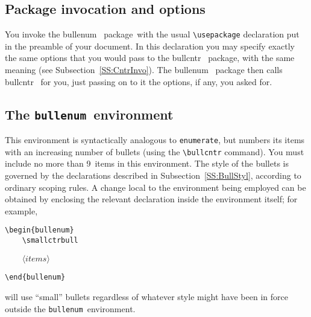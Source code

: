 \documentclass[a4paper]{article}
\DeclareRobustCommand*{\packlass}[1]{%
	{\texorpdfstring{\normalfont \sffamily}{}#1}%
}
\DeclareRobustCommand*{\meta}[1]{\mbox{\(\langle\textit{#1}\rangle\)}}
\DeclareRobustCommand*{\env}[1]{\texttt{#1}}
\newcommand*{\Bullcntr}{bullcntr}
\newcommand*{\bull}{\packlass{\Bullcntr}}
\newcommand*{\tbull}{the \bull\ package}
\newcommand*{\Bullenum}{bullenum}
\newcommand*{\benu}{\packlass{\Bullenum}}
\newcommand*{\tbenu}{the \benu\ package}
\newcommand*{\Enumerat}{enumerate}
\newcommand*{\beenv}{\env{\Bullenum}}
\newcommand*{\enenv}{\env{\Enumerat}}
\begin{document}
\subsection{Package invocation and options}
\label{SS:EnumInvo}

You invoke \tbenu\ with the usual \verb|\usepackage| declaration put
in the preamble of your document.  In this declaration you may specify
exactly the same options that you would pass to \tbull, with the same
meaning (see Subsection~\ref{SS:CntrInvo}).  The \benu\ package then
calls \bull\ for you, just passing on to it the options, if any, you
asked for.




\subsection{The \beenv\ environment}
\label{SS:EnumEnvi}

This environment is syntactically analogous to \enenv, but numbers its
items with an increasing number of bullets (using the \verb|\bullcntr|
command).  You must include no more than 9~items in this environment.
The style of the bullets is governed by the declarations described in
Subsection~\ref{SS:BullStyl}, according to ordinary scoping rules.  A
change local to the environment being employed can be obtained by
enclosing the relevant declaration inside the environment itself; for
example,
%
\begin{verbatim}
\begin{bullenum}
    \smallctrbull
\end{verbatim}
\begin{flushleft}
	\texttt{\ \ \ \ }\meta{items}
\end{flushleft}
\begin{verbatim}
\end{bullenum}
\end{verbatim}
%
will use ``small'' bullets regardless of whatever style might have
been in force outside the \beenv\ environment.

\pagebreak[2]
\end{document}
